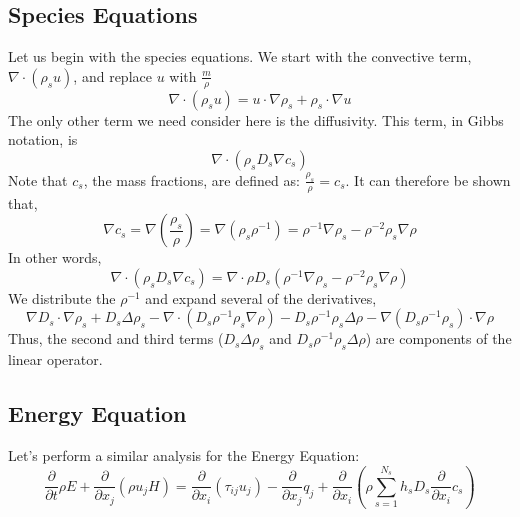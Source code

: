 \documentclass[10pt]{article}
\begin{document}
\subsection{Species Equations}
Let us begin with the species equations. We start with the convective
term, $\nabla \cdot (\rho_s u)$, and replace $u$ with $\frac{m}{\rho}$
\begin{equation}
  \nabla \cdot (\rho_s u) = u \cdot \nabla \rho_s + \rho_s \cdot \nabla
   u 
\end{equation}
\newline
\newline
The only other term we need consider here is 
the diffusivity. This term, in Gibbs notation, is
\begin{equation}
  \nabla \cdot (\rho_s D_s \nabla c_s)
\end{equation}
Note that $c_s$, the mass fractions, are defined as:
$\frac{\rho_s}{\rho} = 
c_s$.  It can therefore be shown that,
\begin{equation}
  \nabla c_s = \nabla (\frac{\rho_s}{\rho}) = \nabla (\rho_s \rho^{-1})
             = \rho^{-1} \nabla \rho_s - \rho^{-2} \rho_s \nabla \rho
\end{equation}
In other words,
\begin{equation}
  \label{eq:speciesdiffexpansion}
  \nabla \cdot (\rho_s D_s \nabla c_s) = \nabla \cdot \rho D_s (\rho^{-1} \nabla \rho_s - \rho^{-2} \rho_s \nabla \rho)
\end{equation}
We distribute the $\rho^{-1}$ and expand several of the derivatives,
\begin{equation}
  \nabla D_s \cdot \nabla \rho_s + D_s \Delta \rho_s - \nabla \cdot (D_s \rho^{-1} \rho_s \nabla \rho) - D_s \rho^{-1} \rho_s \Delta \rho - \nabla(D_s \rho^{-1} \rho_s) \cdot \nabla \rho
\end{equation}
Thus, the second and third terms ($D_s \Delta \rho_s$ and $D_s \rho^{-1}
\rho_s \Delta \rho$) are components of the linear operator. 

\subsection{Energy Equation}

Let's perform a similar analysis for the Energy Equation:
\begin{equation}
\frac{\partial}{\partial t} \rho E + \frac{\partial }{\partial x_j}\left(\rho
u_j H\right) = \frac{\partial }{\partial x_i}\left(\tau_{ij}u_j\right) -
\frac{\partial }{\partial x_j}q_j + \frac{\partial }{\partial x_i}\left(\rho
\sum^{N_s}_{s=1} h_s D_s \frac{\partial}{\partial x_i} c_s\right)
\end{equation}
\end{document}
